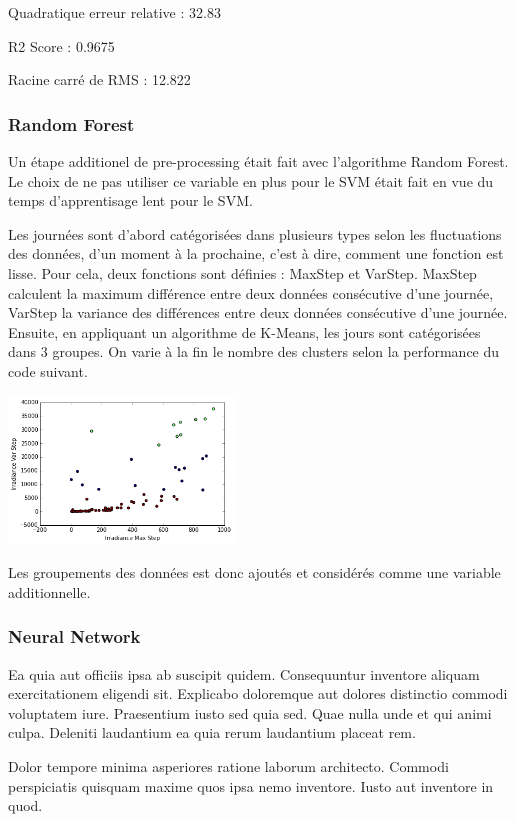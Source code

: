 \documentclass[a4paper]{article}
\begin{document}
\begin{multicols}{2}
Quadratique erreur relative : 32.83

R2 Score : 0.9675

Racine carré de RMS : 12.822

\subsubsection{Random Forest}
Un étape additionel de pre-processing était fait avec l'algorithme Random Forest. Le choix de ne pas utiliser ce variable en plus pour le SVM était fait en vue du temps d'apprentisage lent pour le SVM. 

Les journées sont d’abord catégorisées dans plusieurs types selon les fluctuations des données, d’un moment à la prochaine, c’est à dire, comment une fonction est lisse. Pour cela, deux fonctions sont définies : MaxStep et VarStep. MaxStep calculent la maximum différence entre deux données consécutive d’une journée, VarStep la variance des différences entre deux données consécutive d’une journée. Ensuite, en appliquant un algorithme de K-Means, les jours sont catégorisées dans 3 groupes. On varie à la fin le nombre des clusters selon la performance du code suivant.


\includegraphics[width=0.45\textwidth]{./images/categoriesgraph.png}


Les groupements des données est donc ajoutés et considérés comme une variable additionnelle. 




\subsubsection{Neural Network}
Ea quia aut officiis ipsa ab suscipit quidem. Consequuntur inventore aliquam
    exercitationem eligendi sit. Explicabo doloremque aut dolores distinctio
    commodi voluptatem iure. Praesentium iusto sed quia sed. Quae nulla unde et
    qui animi culpa. Deleniti laudantium ea quia rerum laudantium placeat rem.

Dolor tempore minima asperiores ratione laborum architecto. Commodi perspiciatis
    quisquam maxime quos ipsa nemo inventore. Iusto aut inventore in quod.


\end{multicols}
\end{document}
